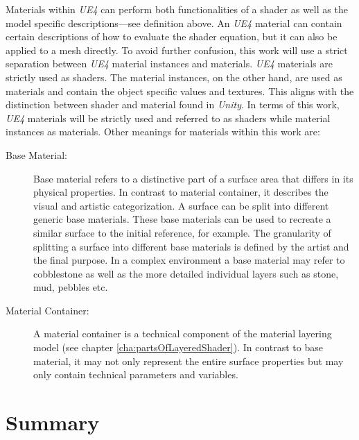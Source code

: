 	Materials within \emph{UE4} can perform both functionalities of a shader as well as the model specific descriptions---see definition above. An \emph{UE4} material can contain certain descriptions of how to evaluate the shader equation, but it can also be applied to a mesh directly. 
	To avoid further confusion, this work will use a strict separation between \emph{UE4} material instances and materials. \emph{UE4} materials are strictly used as shaders. The material instances, on the other hand, are used as materials and contain the object specific values and textures. This aligns with the distinction between shader and material found in \emph{Unity}. In terms of this work, \emph{UE4} materials will be strictly used and referred to as shaders while material instances as materials.	Other meanings for materials within this work are:
	\begin{description}
		\item [Base Material:] Base material refers to a distinctive part of a surface area that differs in its physical properties. In contrast to material container, it describes the visual and artistic categorization. A surface can be split into different generic base materials. These base materials can be used to recreate a similar surface to the initial reference, for example. The granularity of splitting a surface into different base materials is defined by the artist and the final purpose. In a complex environment a base material may refer to cobblestone as well as the more detailed individual layers such as stone, mud, pebbles etc.       
		\item [Material Container:]	A material container is a technical component of the material layering model (see chapter \ref{cha:partsOfLayeredShader}). In contrast to base material, it may not only represent the entire surface properties but may only contain technical parameters and variables.  
	\end{description}

\section{Summary}

